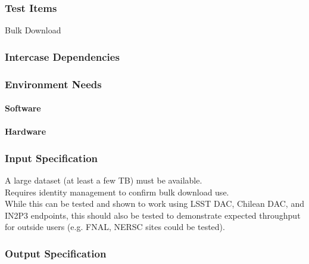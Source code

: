 \subsubsection{Test Items}
Bulk Download



\subsubsection{Intercase Dependencies}

\subsubsection{Environment Needs}

\paragraph{Software}

\paragraph{Hardware}

\subsubsection{Input Specification}
A large dataset (at least a few TB) must be available.\\
Requires identity management to confirm bulk download use.\\
While this can be tested and shown to work using LSST DAC, Chilean DAC,
and IN2P3 endpoints, this should also be tested to demonstrate expected
throughput for outside users (e.g. FNAL, NERSC sites could be tested).


\subsubsection{Output Specification}

